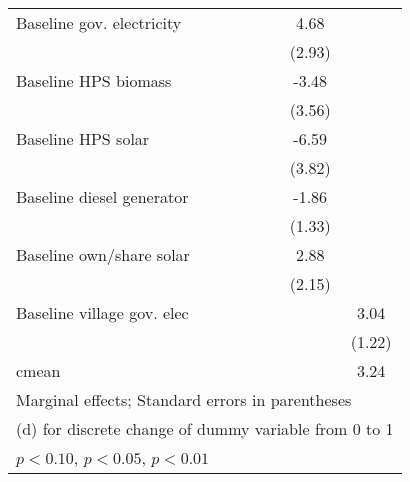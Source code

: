 \begin{table}[htbp]
\begin{tabular*}{1\hsize}{@{\hskip\tabcolsep\extracolsep\fill}l*{6}{c}}
Baseline gov. electricity&                  &                  &                  &                  &     4.68         &                  \\
                &                  &                  &                  &                  &   (2.93)         &                  \\
Baseline HPS biomass&                  &                  &                  &                  &    -3.48         &                  \\
                &                  &                  &                  &                  &   (3.56)         &                  \\
Baseline HPS solar&                  &                  &                  &                  &    -6.59\sym{*}  &                  \\
                &                  &                  &                  &                  &   (3.82)         &                  \\
Baseline diesel generator&                  &                  &                  &                  &    -1.86         &                  \\
                &                  &                  &                  &                  &   (1.33)         &                  \\
Baseline own/share solar&                  &                  &                  &                  &     2.88         &                  \\
                &                  &                  &                  &                  &   (2.15)         &                  \\
Baseline village gov. elec&                  &                  &                  &                  &                  &     3.04\sym{**} \\
                &                  &                  &                  &                  &                  &   (1.22)         \\
\midrule
cmean           &                  &                  &                  &                  &                  &     3.24         \\
\bottomrule
\multicolumn{7}{l}{\footnotesize Marginal effects; Standard errors in parentheses}\\
\multicolumn{7}{l}{\footnotesize  (d) for discrete change of dummy variable from 0 to 1}\\
\multicolumn{7}{l}{\footnotesize \sym{*} \(p<0.10\), \sym{**} \(p<0.05\), \sym{***} \(p<0.01\)}\\
\end{tabular*}
\end{table}
